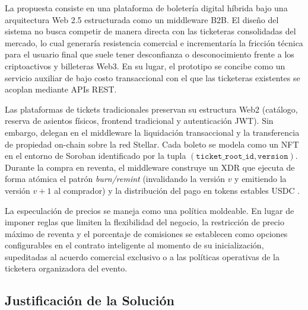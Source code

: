 La propuesta consiste en una plataforma de boletería digital híbrida bajo una arquitectura Web 2.5
estructurada como un middleware B2B.
El diseño del sistema no busca competir de manera directa con las ticketeras consolidadas del mercado, lo
cual generaría resistencia 
comercial e incrementaría la fricción técnica para el usuario final que suele tener desconfianza o
desconocimiento frente a los 
criptoactivos y billeteras Web3. En su lugar, el prototipo se concibe como un servicio auxiliar de bajo costo
transaccional con 
el que las ticketeras existentes se acoplan mediante APIs REST. 

Las plataformas de tickets tradicionales preservan su estructura Web2 (catálogo, reserva de asientos físicos,
frontend tradicional 
y autenticación JWT). Sin embargo, delegan en el middleware la liquidación transaccional y la transferencia
de propiedad on-chain 
sobre la red Stellar. Cada boleto se modela como un NFT en el entorno de Soroban \cite{sdf2024soroban}
identificado por la 
tupla \((\texttt{ticket\_root\_id}, \texttt{version})\). Durante la compra en reventa, el middleware
construye un XDR que ejecuta 
de forma atómica el patrón \textit{burn/remint} (invalidando la versión $v$ y emitiendo la versión $v+1$ al
comprador) y la 
distribución del pago en tokens estables USDC \cite{sdf2024stablecoins}.

La especulación de precios se maneja como una política moldeable. En lugar de imponer reglas que limiten la
flexibilidad del 
negocio, la restricción de precio máximo de reventa y el porcentaje de comisiones se establecen como opciones
configurables 
en el contrato inteligente al momento de su inicialización, supeditadas al acuerdo comercial exclusivo o a
las políticas 
operativas de la ticketera organizadora del evento.

\subsection{Justificación de la Solución}

